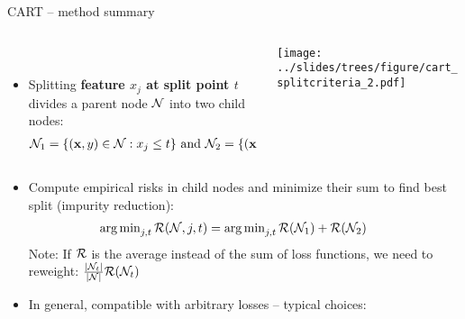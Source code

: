 \begin{frame}{CART -- method summary}

\footnotesize

\begin{columns}[T, totalwidth=\linewidth]
    \begin{column}{0.6\linewidth}
    
 \\
    \begin{itemize}
\item Splitting \textbf{feature $x_j$ at split point $t$} divides a parent node $\mathcal{N}$ into two child nodes:
 \begin{align*}\mathcal{N}_1 = \{ (\mathbf{x}, y) \in \mathcal{N}: x_j \leq t \} \text{ and } \mathcal{N}_2 = \{ (\mathbf{x}, y) \in \mathcal{N}: x_j > t \}
      \end{align*}
  
\end{itemize}
    \end{column}
    \begin{column}{0.375\linewidth}
{\centering \texttt{[image: ../slides/trees/figure/cart\_splitcriteria\_2.pdf]} 
}
\end{column}
\end{columns}
\begin{itemize}
  \item Compute empirical risks in child nodes and minimize their sum to find best split (impurity reduction):
     \begin{align*}
      \argmin_{j, t} \risk(\Np, j, t) &= \argmin_{j, t} \risk(\Nl) + \risk(\Nr) \;\;\; %
      \end{align*}
      Note: If $\mathcal{R}$ is the average instead of the sum of loss functions, we need to reweight: $\tfrac{|\mathcal{N}_t|}{|\mathcal{N}|} \mathcal{R}(\mathcal{N}_t)$
      
  \item In general, compatible with arbitrary losses -- typical choices:
  \begin{itemize}
    \footnotesize


\end{itemize}
\end{itemize}
\end{frame}
